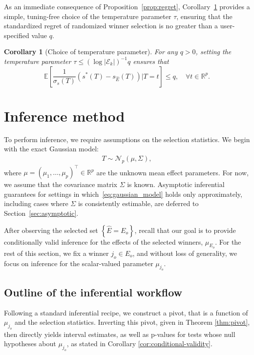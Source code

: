 \documentclass[12pt]{article}
\newcommand{\rbracket}[1]{\left[ #1 \right]}
\newtheorem{corollary}{Corollary}[section]
\newcommand{\real}{\mathbb{R}}
\newcommand{\Ee}{{\mathbb{E}}}
\newcommand{\Ek}{\mathcal{E}_{k}}      %
\newcommand{\Ehat}{\widehat{E}}
\newcommand{\snoise}{\sigma_{s}}
\begin{document}
As an immediate consequence of Proposition~\ref{prop:regret}, Corollary~\ref{cor: temp par} provides a simple, tuning-free choice of the temperature parameter $\tau$, ensuring that the standardized regret of randomized winner selection is no greater than a user-specified value $q$.

\begin{corollary}[Choice of temperature parameter]
For any $q>0$, setting the temperature parameter $\tau \leq (\log |\Ek|)^{-1}q$ ensures that 
$$
\Ee\rbracket{\frac{1}{\snoise(T)} (s^*(T)-s_{\Ehat}(T))\Big\lvert T=t} \leq q, \quad \forall t\in \real^p.
$$
 \label{cor: temp par}
 \end{corollary}



\section{Inference method}
\label{sec:method}

To perform inference, we require assumptions on the selection statistics. 
We begin with the exact Gaussian model:
\begin{align}
\label{eq:gaussian_model}
T \sim \mathcal{N}_p(\mu ,\Sigma),
\end{align}
where $\mu = (\mu_1,\ldots, \mu_p)^\top \in \real^p$ are the unknown mean effect parameters.
For now, we assume that the covariance matrix $\Sigma$ is known. 
Asymptotic inferential guarantees for settings in which~\eqref{eq:gaussian_model} holds only approximately, including cases where $\Sigma$ is consistently estimable, are deferred to Section~\ref{sec:asymptotic}.

After observing the selected set $\left\{\Ehat = E_o\right\}$, recall that our goal is to provide conditionally valid inference for the effects of the selected winners, $\mu_{E_o}$. 
For the rest of this section, we fix a winner $j_o \in E_o$, and without loss of generality, we focus on inference for the scalar-valued parameter $\mu_{j_o}$. 

\subsection{Outline of the inferential workflow}

Following a standard inferential recipe, we construct a pivot, that is a function of $\mu_{j_o}$ and the selection statistics. 
Inverting this pivot, given in Theorem \ref{thm:pivot}, then directly yields interval estimates, as well as p-values for tests whose null hypotheses about $\mu_{j_o}$, as stated in Corollary \ref{cor:conditional-validity}.
\end{document}
